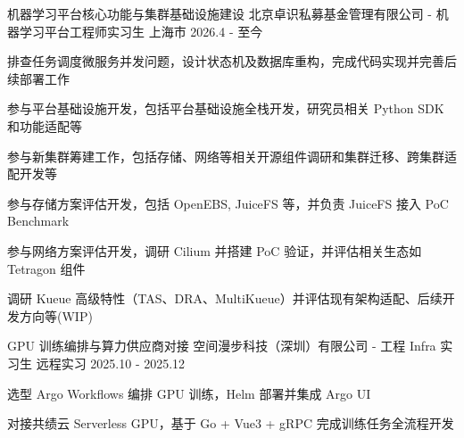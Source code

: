 
\begin{cventries}

\cventry
    {机器学习平台核心功能与集群基础设施建设}
    {北京卓识私募基金管理有限公司 - 机器学习平台工程师实习生}
    {上海市}
    {2026.4 - 至今}
    {
        \begin{cvitems}
            \item {排查任务调度微服务并发问题，设计状态机及数据库重构，完成代码实现并完善后续部署工作}
            \item {参与平台基础设施开发，包括平台基础设施全栈开发，研究员相关 Python SDK 和功能适配等}
            \item {参与新集群筹建工作，包括存储、网络等相关开源组件调研和集群迁移、跨集群适配开发等}
            \item {参与存储方案评估开发，包括 OpenEBS, JuiceFS 等，并负责 JuiceFS 接入 PoC Benchmark}
            \item {参与网络方案评估开发，调研 Cilium 并搭建 PoC 验证，并评估相关生态如 Tetragon 组件}
            \item {调研 Kueue 高级特性（TAS、DRA、MultiKueue）并评估现有架构适配、后续开发方向等(WIP)}
        \end{cvitems}
    }

\vspace{0.3em}

\cventry
    {GPU 训练编排与算力供应商对接}
    {空间漫步科技（深圳）有限公司 - 工程 Infra 实习生}
    {远程实习}
    {2025.10 - 2025.12}
    {
        \begin{cvitems}
            \item {选型 Argo Workflows 编排 GPU 训练，Helm 部署并集成 Argo UI}
            \item {对接共绩云 Serverless GPU，基于 Go + Vue3 + gRPC 完成训练任务全流程开发}
        \end{cvitems}
    }

\end{cventries}

